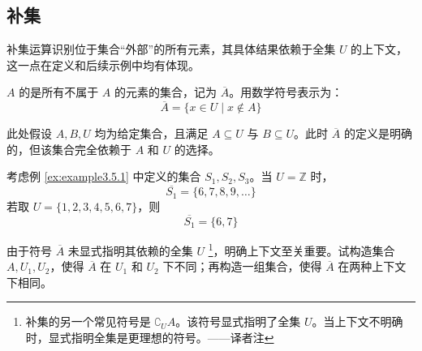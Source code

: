\subsection{补集}

补集运算识别位于集合``外部''的所有元素，其具体结果依赖于全集 $U$ 的上下文，这一点在定义和后续示例中均有体现。

\begin{definition}
    $A$ 的是所有不属于 $A$ 的元素的集合，记为 $\overline{A}$。用数学符号表示为：
    \[\overline{A} = \{x \in U \mid x \notin A\}\]
\end{definition}

此处假设 $A, B, U$ 均为给定集合，且满足 $A \subseteq U$ 与 $B \subseteq U$。此时 $\overline{A}$ 的定义是明确的，但该集合完全依赖于 $A$ 和 $U$ 的选择。

\begin{example}
    考虑例 \ref{ex:example3.5.1} 中定义的集合 $S_1, S_2, S_3$。当 $U = \mathbb{Z}$ 时，
    \[\overline{S_1} = \{6, 7, 8, 9, \dots \}\]
    若取 $U = \{1, 2, 3, 4, 5, 6, 7\}$，则
    \[\overline{S_1} = \{6, 7\}\]
\end{example}

由于符号 $\overline{A}$ 未显式指明其依赖的全集 $U$ \footnote{补集的另一个常见符号是 $\complement_U A$。该符号显式指明了全集 $U$。当上下文不明确时，显式指明全集是更理想的符号。——译者注}，明确上下文至关重要。试构造集合 $A, U_1, U_2$，使得 $\overline{A}$ 在 $U_1$ 和 $U_2$ 下不同；再构造一组集合，使得 $\overline{A}$ 在两种上下文下相同。
